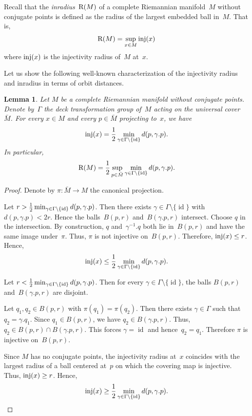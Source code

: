 \documentclass[11pt,reqno]{amsart}
\newtheorem{lemma}[theorem]{Lemma}
\theoremstyle{definition}
\numberwithin{equation}{section}
\newcommand\RR{{\rm R}}
\DeclareMathOperator{\inj}{{\rm inj}}
\DeclareMathOperator{\id}{id}
\numberwithin{equation}{section}
\begin{document}
Recall that the \emph{inradius}~$\RR(M)$ of a complete Riemannian manifold~$M$ without conjugate points is defined as the radius of the largest embedded ball in~$M$.
That is,
\[
\RR(M) = \sup_{x \in M} \inj(x)
\]
where $\inj(x)$ is the injectivity radius of~$M$ at~$x$.

\medskip

Let us show the following well-known characterization of the injectivity radius and inradius in terms of orbit distances.

\begin{lemma} \label{lem:inrad-dist}
Let $M$ be a complete Riemannian manifold without conjugate points.
Denote by~$\Gamma$ the deck transformation group of~$M$ acting on the universal cover~$\bar{M}$.
For every $x \in M$ and every $p \in \bar{M}$ projecting to~$x$, we have
\[
\inj(x) = \frac{1}{2} \min_{\gamma \in \Gamma \setminus \{ {\rm id} \}} d(p,\gamma.p).
\]
In particular,
\[
\RR(M) = \frac{1}{2} \sup_{p \in \bar{M}} \min_{\gamma \in \Gamma \setminus \{ {\rm id} \}} d(p,\gamma.p).
\]
\end{lemma}

\begin{proof}
Denote by $\pi:\bar{M} \to M$ the canonical projection.

Let $r>\frac{1}{2} \min_{\gamma \in \Gamma \setminus \{ {\rm id} \}} d(p,\gamma.p)$.
Then there exists $\gamma \in \Gamma \setminus \{ \id \}$ with $d(p,\gamma.p) <2r$.
Hence the balls~$B(p,r)$ and~$B(\gamma.p,r)$ intersect.
Choose $q$ in the intersection.
By construction, $q$ and~$\gamma^{-1}.q$ both lie in~$B(p,r)$ and have the same image under~$\pi$.
Thus, $\pi$ is not injective on~$B(p,r)$.
Therefore, $\inj(x) \leq r$.
Hence,
\[
\inj(x) \leq \frac{1}{2} \min_{\gamma \in \Gamma \setminus \{ {\rm id} \}} d(p,\gamma.p).
\]

Let $r<\frac{1}{2} \min_{\gamma \in \Gamma \setminus \{ {\rm id} \}} d(p,\gamma.p)$.
Then for every $\gamma \in \Gamma \setminus \{ \id \}$, the balls $B(p,r)$ and~$B(\gamma.p,r)$ are disjoint.

Let $q_1, q_2 \in B(p,r)$ with $\pi(q_1)=\pi(q_2)$.
Then there exists $\gamma \in \Gamma$ such that $q_2=\gamma.q_1$.
Since $q_1 \in B(p,r)$, we have $q_2 \in B(\gamma.p,r)$.
Thus, $q_2 \in B(p,r) \cap B(\gamma.p,r)$.
This forces $\gamma=\id$ and hence~$q_2=q_1$.
Therefore $\pi$ is injective on~$B(p,r)$.

Since $M$ has no conjugate points, the injectivity radius at~$x$ coincides with the largest radius of a ball centered at~$p$ on which the covering map is injective.
Thus, $\inj(x) \geq r$.
Hence,
\[
\inj(x) \geq \frac{1}{2} \min_{\gamma \in \Gamma \setminus \{ {\rm id} \}} d(p,\gamma.p).
\]
\end{proof}
\end{document}
